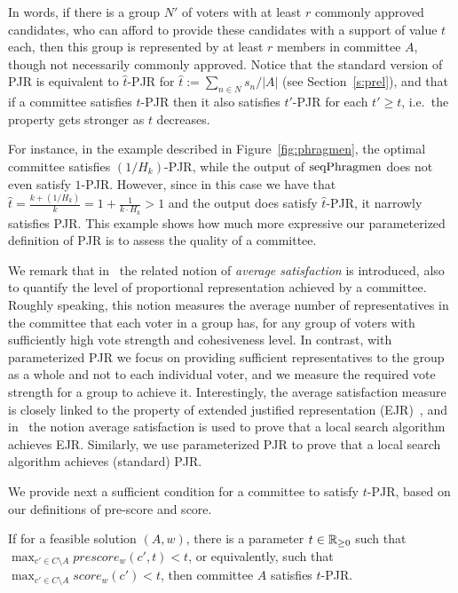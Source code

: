 In words, if there is a group $N'$ of voters with at least $r$ commonly approved candidates, who can afford to provide these candidates with a support of value $t$ each, then this group is represented by at least $r$ members in committee $A$, though not necessarily commonly approved. Notice that the standard version of PJR is equivalent to $\hat{t}$-PJR for $\hat{t}:=\sum_{n\in N} s_n / |A|$ (see Section~\ref{s:prel}), and that if a committee satisfies $t$-PJR then it also satisfies $t'$-PJR for each $t'\geq t$, i.e.~the property gets stronger as $t$ decreases. 

For instance, in the example described in Figure~\ref{fig:phragmen}, the optimal committee satisfies $(1/H_k)$-PJR, while the output of $\operatorname{seqPhragmen}$ does not even satisfy $1$-PJR. However, since in this case we have that $\hat{t}=\frac{k+(1/H_k)}{k}=1+\frac{1}{k\cdot H_k}>1$ and the output does satisfy $\hat{t}$-PJR, it narrowly satisfies PJR. This example shows how much more expressive our parameterized definition of PJR is to assess the quality of a committee. 

We remark that in~\cite{sanchez2017proportional} the related notion of \emph{average satisfaction} is introduced, also to quantify the level of proportional representation achieved by a committee. Roughly speaking, this notion measures the average number of representatives in the committee that each voter in a group has, for any group of voters with sufficiently high vote strength and cohesiveness level. 
In contrast, with parameterized PJR we focus on providing sufficient representatives to the group as a whole and not to each individual voter, and we measure the required vote strength for a group to achieve it.
Interestingly, the average satisfaction measure is closely linked to the property of extended justified representation (EJR)~\cite{aziz2017justified}, and in~\cite{aziz2018complexity} the notion average satisfaction is used to prove that a local search algorithm achieves EJR. 
Similarly, we use parameterized PJR to prove that a local search algorithm achieves (standard) PJR.

We provide next a sufficient condition for a committee to satisfy $t$-PJR, based on our definitions of pre-score and score.  

\begin{lemma} \label{lem:locality}
If for a feasible solution $(A,w)$, there is a parameter $t\in\mathbb{R}_{\geq 0}$ such that $\max_{c'\in C\setminus A} prescore_w(c',t)<t$, or equivalently, such that $\max_{c'\in C\setminus A} score_w(c') <t$, then committee $A$ satisfies $t$-PJR.
\end{lemma}

